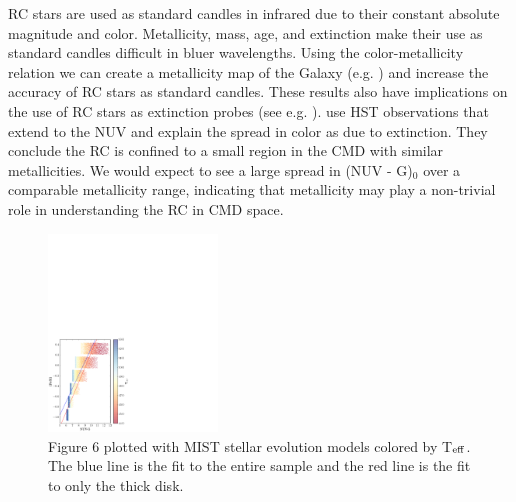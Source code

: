 \documentclass[twocolumn]{emulateapj}
\begin{document}
RC stars are used as standard candles in infrared due to their constant absolute magnitude and color. Metallicity, mass, age, and extinction make their use as standard candles difficult in bluer wavelengths. Using the color-metallicity relation we can create a metallicity map of the Galaxy (e.g. \citealt{onal16}) and increase the accuracy of RC stars as standard candles. These results also have implications on the use of RC stars as extinction probes (see e.g. \citealt{girardi16}). \citealt{yanchulova17} use HST observations that extend to the NUV and explain the spread in color as due to extinction. They conclude the RC is confined to a small region in the CMD with similar metallicities. We would expect to see a large spread in (NUV - G)$_0$ over a comparable metallicity range, indicating that metallicity may play a non-trivial role in understanding the RC in CMD space. 




\begin{figure}[]
\centering
\includegraphics[width=0.4\textwidth]{f8.pdf}
\caption{Figure 6 plotted with MIST stellar evolution models colored by T$_{\rm{eff}}$. The blue line is the fit to the entire sample and the red line is the fit to only the thick disk.}
\end{figure}
\end{document}
